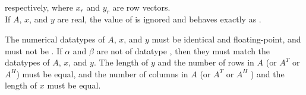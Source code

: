 \begin{flaspec}
{\begin{center}
\begin{math}
\begin{array}{cclcccl}
\end{array}
\end{math}
\end{center}
respectively, where $ x_r $ and $ y_r $ are row vectors. \\
If $ A $, $ x $, and $ y $ are real, the value of \conjx is ignored and
\flagemvc behaves exactly as \flagemvns.
}
\begin{checks}
\checkitem
The numerical datatypes of $ A $, $ x $, and $ y $ must be identical and
floating-point, and must not be \flaconstantns.
\itemvsp
\checkitem
If $ \alpha $ and $ \beta $ are not of datatype \flaconstantns, then they must
match the datatypes of $ A $, $ x $, and $ y $.
\itemvsp
\checkitem
The length of $ y $ and the number of rows in $ A $ (or $ A^T $ or $ A^H $)
must be equal, and the number of columns in $ A $ (or $ A^T $ or $ A^H $ ) and
the length of $ x $ must be equal.
\end{checks}
\begin{params}
\end{params}
\end{flaspec}


